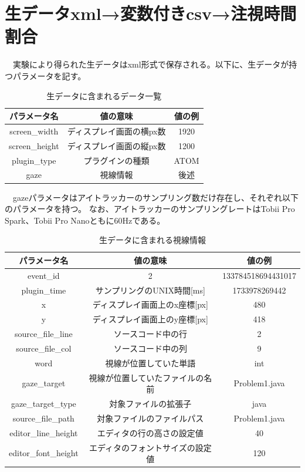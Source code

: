 \documentclass[paper=a4paper,fontsize=11pt]{jlreq}
\begin{document}
  \section{生データxml→変数付きcsv→注視時間割合}
  　実験により得られた生データはxml形式で保存される。以下に、生データが持つパラメータを記す。\\
    \begin{table}[h]
      \centering
      \caption{生データに含まれるデータ一覧}
      \begin{tabular}{|c|c|c|}
        \hline
        パラメータ名 & 値の意味 & 値の例 \\ \hline
        screen\_width & ディスプレイ画面の横px数 & 1920 \\ \hline
        screen\_height & ディスプレイ画面の縦px数 & 1200 \\ \hline
        plugin\_type & プラグインの種類 & ATOM \\ \hline
        gaze & 視線情報 & 後述 \\ \hline
      \end{tabular}
      \label{tab:basic}
    \end{table}
   \FloatBarrier

  　gazeパラメータはアイトラッカーのサンプリング数だけ存在し、それぞれ以下のパラメータを持つ。
  なお、アイトラッカーのサンプリングレートはTobii Pro Spark、Tobii Pro Nanoともに60Hzである。

  \begin{table}[h]
    \centering
    \caption{生データに含まれる視線情報}
    \begin{tabular}{|c|c|c|}
        \hline
        パラメータ名 & 値の意味 & 値の例 \\ \hline
        event\_id & 2 & 133784518694431017 \\ \hline
        plugin\_time & サンプリングのUNIX時間[ms] & 1733978269442 \\ \hline
        x & ディスプレイ画面上のx座標[px] & 480 \\ \hline
        y & ディスプレイ画面上のy座標[px] & 418 \\ \hline
        source\_file\_line & ソースコード中の行 & 2 \\ \hline
        source\_file\_col & ソースコード中の列 & 9 \\ \hline
        word & 視線が位置していた単語 & int \\ \hline
        gaze\_target & 視線が位置していたファイルの名前 & Problem1.java \\ \hline
        gaze\_target\_type & 対象ファイルの拡張子 & java \\ \hline
        source\_file\_path & 対象ファイルのファイルパス & Problem1.java \\ \hline
        editor\_line\_height & エディタの行の高さの設定値 & 40 \\ \hline
        editor\_font\_height & エディタのフォントサイズの設定値 & 120 \\ \hline
    \end{tabular}
    \label{tab:basic}
  \end{table}
  \FloatBarrier
  
\end{document}
